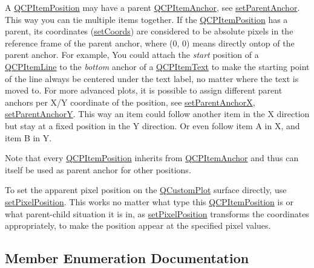 A \hyperlink{classQCPItemPosition}{Q\+C\+P\+Item\+Position} may have a parent \hyperlink{classQCPItemAnchor}{Q\+C\+P\+Item\+Anchor}, see \hyperlink{classQCPItemPosition_ac094d67a95d2dceafa0d50b9db3a7e51}{set\+Parent\+Anchor}. This way you can tie multiple items together. If the \hyperlink{classQCPItemPosition}{Q\+C\+P\+Item\+Position} has a parent, its coordinates (\hyperlink{classQCPItemPosition_aa988ba4e87ab684c9021017dcaba945f}{set\+Coords}) are considered to be absolute pixels in the reference frame of the parent anchor, where (0, 0) means directly ontop of the parent anchor. For example, You could attach the {\itshape start} position of a \hyperlink{classQCPItemLine}{Q\+C\+P\+Item\+Line} to the {\itshape bottom} anchor of a \hyperlink{classQCPItemText}{Q\+C\+P\+Item\+Text} to make the starting point of the line always be centered under the text label, no matter where the text is moved to. For more advanced plots, it is possible to assign different parent anchors per X/Y coordinate of the position, see \hyperlink{classQCPItemPosition_add71461a973927c74e42179480916d9c}{set\+Parent\+AnchorX}, \hyperlink{classQCPItemPosition_add5ec1db9d19cec58a3b5c9e0a0c3f9d}{set\+Parent\+AnchorY}. This way an item could follow another item in the X direction but stay at a fixed position in the Y direction. Or even follow item A in X, and item B in Y.

Note that every \hyperlink{classQCPItemPosition}{Q\+C\+P\+Item\+Position} inherits from \hyperlink{classQCPItemAnchor}{Q\+C\+P\+Item\+Anchor} and thus can itself be used as parent anchor for other positions.

To set the apparent pixel position on the \hyperlink{classQCustomPlot}{Q\+Custom\+Plot} surface directly, use \hyperlink{classQCPItemPosition_a8d4f858f2089973967cf9cb81970ef0a}{set\+Pixel\+Position}. This works no matter what type this \hyperlink{classQCPItemPosition}{Q\+C\+P\+Item\+Position} is or what parent-\/child situation it is in, as \hyperlink{classQCPItemPosition_a8d4f858f2089973967cf9cb81970ef0a}{set\+Pixel\+Position} transforms the coordinates appropriately, to make the position appear at the specified pixel values. 

\subsection{Member Enumeration Documentation}
